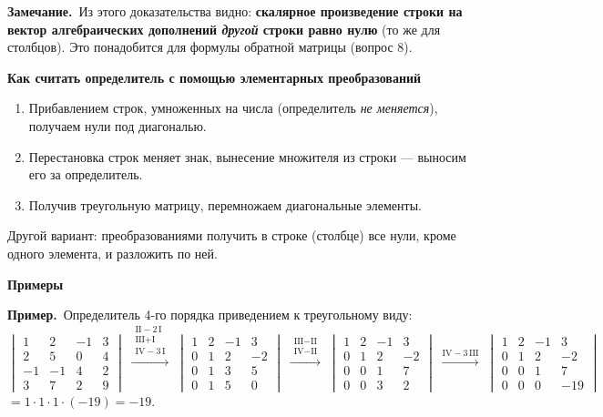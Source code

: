 \documentclass[a4paper,11pt]{article}
\newcommand{\gauss}[1]{\;\xrightarrow{\scriptstyle #1}\;}
\newcommand{\prim}{\par\smallskip\noindent\textbf{\textcolor{teoc!80!black}{Пример.}}\ }
\newcommand{\zam}{\par\smallskip\noindent\textbf{\textcolor{zamc}{Замечание.}}\ }
\newcommand{\podr}[1]{\par\needspace{8\baselineskip}\medskip
  {\large\bfseries\textcolor{oprc!80!black}{#1}}\par\nopagebreak\smallskip}
\begin{document}
\zam Из этого доказательства видно: \textbf{скалярное произведение строки на вектор алгебраических дополнений
\emph{другой} строки равно нулю} (то же для столбцов). Это понадобится для формулы обратной матрицы (вопрос 8).

\podr{Как считать определитель с помощью элементарных преобразований}

\begin{enumerate}[leftmargin=*]
  \item Прибавлением строк, умноженных на числа (определитель \emph{не меняется}), получаем нули под диагональю.
  \item Перестановка строк меняет знак, вынесение множителя из строки --- выносим его за определитель.
  \item Получив треугольную матрицу, перемножаем диагональные элементы.
\end{enumerate}
Другой вариант: преобразованиями получить в строке (столбце) все нули, кроме одного элемента, и разложить по ней.

\podr{Примеры}

\prim Определитель 4-го порядка приведением к треугольному виду:
\[
  \begin{vmatrix} 1 & 2 & -1 & 3 \\ 2 & 5 & 0 & 4 \\ -1 & -1 & 4 & 2 \\ 3 & 7 & 2 & 9 \end{vmatrix}
  \gauss{\substack{\text{II} - 2\,\text{I} \\ \text{III} + \text{I} \\ \text{IV} - 3\,\text{I}}}
  \begin{vmatrix} 1 & 2 & -1 & 3 \\ 0 & 1 & 2 & -2 \\ 0 & 1 & 3 & 5 \\ 0 & 1 & 5 & 0 \end{vmatrix}
  \gauss{\substack{\text{III} - \text{II} \\ \text{IV} - \text{II}}}
  \begin{vmatrix} 1 & 2 & -1 & 3 \\ 0 & 1 & 2 & -2 \\ 0 & 0 & 1 & 7 \\ 0 & 0 & 3 & 2 \end{vmatrix}
  \gauss{\text{IV} - 3\,\text{III}}
  \begin{vmatrix} 1 & 2 & -1 & 3 \\ 0 & 1 & 2 & -2 \\ 0 & 0 & 1 & 7 \\ 0 & 0 & 0 & -19 \end{vmatrix}
\]
$= 1 \cdot 1 \cdot 1 \cdot (-19) = -19$.
\end{document}
